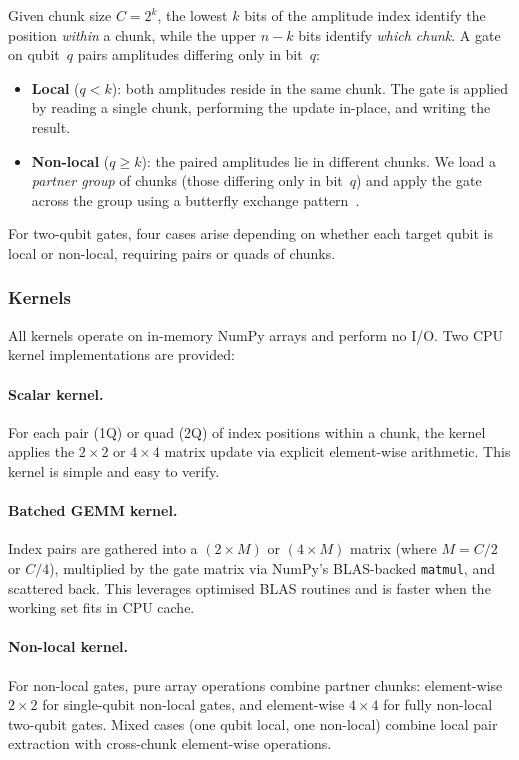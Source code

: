 Given chunk size $C = 2^k$, the lowest $k$ bits of the amplitude index
identify the position \emph{within} a chunk, while the upper $n{-}k$
bits identify \emph{which chunk}. A gate on qubit~$q$ pairs amplitudes
differing only in bit~$q$:
\begin{itemize}
  \item \textbf{Local} ($q < k$): both amplitudes reside in the same
    chunk. The gate is applied by reading a single chunk, performing the
    update in-place, and writing the result.
  \item \textbf{Non-local} ($q \geq k$): the paired amplitudes lie in
    different chunks. We load a \emph{partner group} of chunks (those
    differing only in bit~$q$) and apply the gate across the group using
    a butterfly exchange pattern~\cite{fang2022hisvsim}.
\end{itemize}
For two-qubit gates, four cases arise depending on whether each target
qubit is local or non-local, requiring pairs or quads of chunks.

\subsubsection{Kernels}
\label{sec:kernels}

All kernels operate on in-memory NumPy arrays and perform no I/O.
Two CPU kernel implementations are provided:

\paragraph{Scalar kernel.}
For each pair (1Q) or quad (2Q) of index positions within a chunk,
the kernel applies the $2\!\times\!2$ or $4\!\times\!4$ matrix update
via explicit element-wise arithmetic. This kernel is simple and easy to
verify.

\paragraph{Batched GEMM kernel.}
Index pairs are gathered into a $(2 \times M)$ or $(4 \times M)$ matrix
(where $M = C/2$ or $C/4$), multiplied by the gate matrix via NumPy's
BLAS-backed \texttt{matmul}, and scattered back. This leverages
optimised BLAS routines and is faster when the working set fits in
CPU cache.

\paragraph{Non-local kernel.}
For non-local gates, pure array operations combine partner chunks:
element-wise $2\!\times\!2$ for single-qubit non-local gates, and
element-wise $4\!\times\!4$ for fully non-local two-qubit gates.
Mixed cases (one qubit local, one non-local) combine local pair
extraction with cross-chunk element-wise operations.

